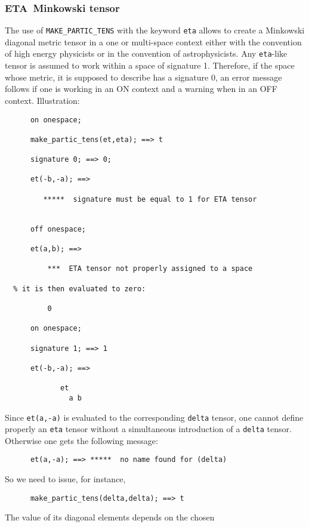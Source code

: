 \subsubsection{ETA\ Minkowski tensor}
The use of \texttt{MAKE\_PARTIC\_TENS} with the
keyword \texttt{eta} allows to create a Minkowski diagonal metric tensor in a
one or multi-space context either with the convention of
 high energy physicists or in the convention of astrophysicists.
Any \texttt{eta}-like tensor is assumed to work within a space
of signature 1. Therefore, if the space whose metric, it is supposed
to describe has a signature 0, an error message follows if one is
working in an ON 
context and a warning when in an OFF  context.
Illustration:
\begin{verbatim}
      on onespace;

      make_partic_tens(et,eta); ==> t

      signature 0; ==> 0;

      et(-b,-a); ==>

         *****  signature must be equal to 1 for ETA tensor


      off onespace;

      et(a,b); ==>

          ***  ETA tensor not properly assigned to a space

  % it is then evaluated to zero:

          0

      on onespace;

      signature 1; ==> 1

      et(-b,-a); ==>

             et
               a b
\end{verbatim}
Since \texttt{et(a,-a)} is evaluated to the corresponding \texttt{delta} tensor,
 one cannot define properly an \texttt{eta} tensor without a
simultaneous introduction of a  \texttt{delta} tensor. Otherwise one gets
the following message:
\begin{verbatim}
      et(a,-a); ==> *****  no name found for (delta)
\end{verbatim}
So we need to issue, for instance,
\begin{verbatim}
      make_partic_tens(delta,delta); ==> t
\end{verbatim}
The value of its diagonal elements depends on the chosen
